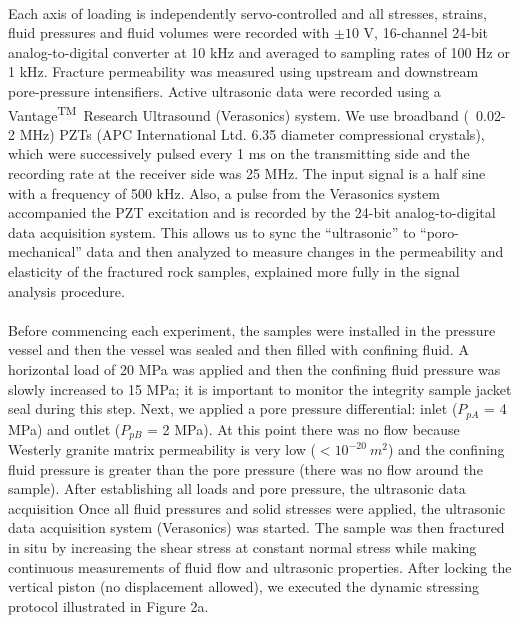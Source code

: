 \paragraph{} Each axis of loading is independently servo-controlled and all stresses, strains, fluid pressures and fluid volumes were recorded with $\pm10$ V, 16-channel 24-bit analog-to-digital converter at 10 kHz and averaged to sampling rates of 100 Hz or 1 kHz. Fracture permeability was measured using upstream and downstream pore-pressure intensifiers. Active ultrasonic data were recorded using a Vantage\textsuperscript{TM}\ Research Ultrasound (Verasonics) system. We use broadband (~0.02-2 MHz) PZTs (APC International Ltd. 6.35 diameter compressional crystals), which were successively pulsed every 1 ms on the transmitting side and the recording rate at the receiver side was 25 MHz. The input signal is a half sine with a frequency of 500 kHz. Also, a pulse from the Verasonics system accompanied the PZT excitation and is recorded by the 24-bit analog-to-digital data acquisition system. This allows us to sync the “ultrasonic” to “poro-mechanical” data and then analyzed to measure changes in the permeability and elasticity of the fractured rock samples, explained more fully in the signal analysis procedure.
  
\paragraph{} Before commencing each experiment, the samples were installed in the pressure vessel and then the vessel was sealed and then filled with confining fluid. A horizontal load of 20 MPa was applied and then the confining fluid pressure was slowly increased to 15 MPa; it is important to monitor the integrity sample jacket seal during this step. Next, we applied a pore pressure differential: inlet ($P_{pA}$ = 4 MPa) and outlet ($P_{pB}$ = 2 MPa). At this point there was no flow because Westerly granite matrix permeability is very low ($< 10^{-20}\ m^2$) and the confining fluid pressure is greater than the pore pressure (there was no flow around the sample). After establishing all loads and pore pressure, the ultrasonic data acquisition Once all fluid pressures and solid stresses were applied, the ultrasonic data acquisition system (Verasonics\textsuperscript{\textregistered}) was started. The sample was then fractured in situ by increasing the shear stress at constant normal stress while making continuous measurements of fluid flow and ultrasonic properties. After locking the vertical piston (no displacement allowed), we executed the dynamic stressing protocol illustrated in Figure 2a.

